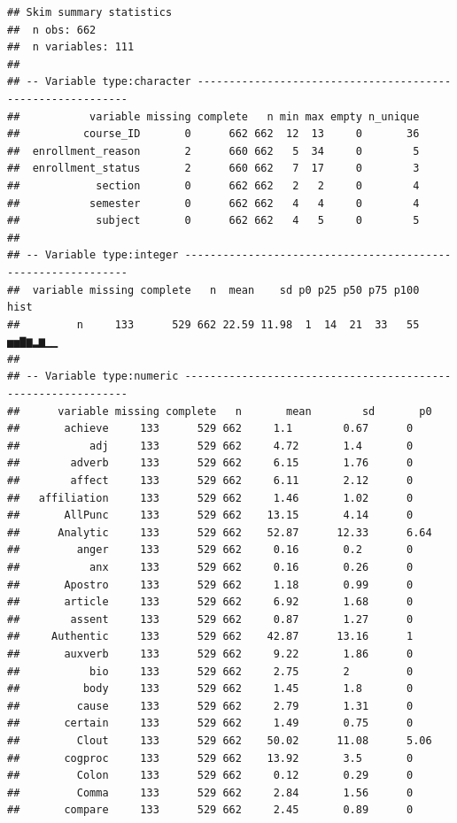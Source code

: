 \documentclass[]{apa6}
\theoremstyle{definition}
\theoremstyle{definition}
\theoremstyle{definition}
\theoremstyle{remark}
\begin{document}
\begin{verbatim}
## Skim summary statistics
##  n obs: 662 
##  n variables: 111 
## 
## -- Variable type:character -----------------------------------------------------------
##           variable missing complete   n min max empty n_unique
##          course_ID       0      662 662  12  13     0       36
##  enrollment_reason       2      660 662   5  34     0        5
##  enrollment_status       2      660 662   7  17     0        3
##            section       0      662 662   2   2     0        4
##           semester       0      662 662   4   4     0        4
##            subject       0      662 662   4   5     0        5
## 
## -- Variable type:integer -------------------------------------------------------------
##  variable missing complete   n  mean    sd p0 p25 p50 p75 p100     hist
##         n     133      529 662 22.59 11.98  1  14  21  33   55 ▅▅▇▆▂▆▁▁
## 
## -- Variable type:numeric -------------------------------------------------------------
##      variable missing complete   n       mean        sd       p0
##       achieve     133      529 662     1.1        0.67      0   
##           adj     133      529 662     4.72       1.4       0   
##        adverb     133      529 662     6.15       1.76      0   
##        affect     133      529 662     6.11       2.12      0   
##   affiliation     133      529 662     1.46       1.02      0   
##       AllPunc     133      529 662    13.15       4.14      0   
##      Analytic     133      529 662    52.87      12.33      6.64
##         anger     133      529 662     0.16       0.2       0   
##           anx     133      529 662     0.16       0.26      0   
##       Apostro     133      529 662     1.18       0.99      0   
##       article     133      529 662     6.92       1.68      0   
##        assent     133      529 662     0.87       1.27      0   
##     Authentic     133      529 662    42.87      13.16      1   
##       auxverb     133      529 662     9.22       1.86      0   
##           bio     133      529 662     2.75       2         0   
##          body     133      529 662     1.45       1.8       0   
##         cause     133      529 662     2.79       1.31      0   
##       certain     133      529 662     1.49       0.75      0   
##         Clout     133      529 662    50.02      11.08      5.06
##       cogproc     133      529 662    13.92       3.5       0   
##         Colon     133      529 662     0.12       0.29      0   
##         Comma     133      529 662     2.84       1.56      0   
##       compare     133      529 662     2.45       0.89      0   

\end{verbatim}
\end{document}
